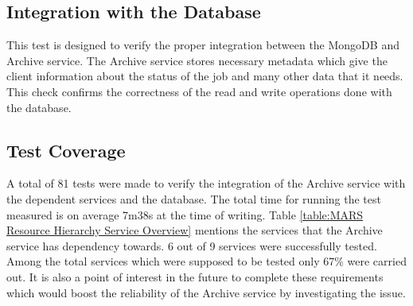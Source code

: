 \subsection{Integration with the Database}
This test is designed to verify the proper integration between the MongoDB and Archive service. The Archive service stores necessary metadata
which give the client information about the status of the job and many other data that it needs. This check confirms the correctness of the read and write 
operations done with the database. 

\subsection{Test Coverage}
A total of 81 tests were made to verify the integration of the Archive service with the dependent services and the database. The 
total time for running the test measured is on average 7m38s at the time of writing. Table \ref{table:MARS Resource Hierarchy Service Overview}
mentions the services that the Archive service has dependency towards. 6 out of 9 services were successfully tested. Among the total services 
which were supposed to be tested only 67\%  were carried out. It is also a point of interest in the future to complete these requirements which would boost the
reliability of the Archive service by investigating the issue.  
